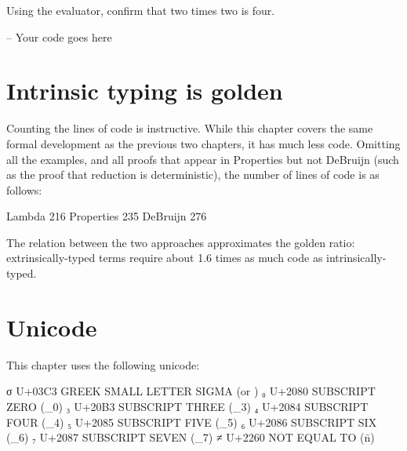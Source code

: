 Using the evaluator, confirm that two times two is four.

\begin{fence}
\begin{code}
-- Your code goes here
\end{code}
\end{fence}

\hypertarget{intrinsic-typing-is-golden}{%
\section{Intrinsic typing is golden}\label{intrinsic-typing-is-golden}}

Counting the lines of code is instructive. While this chapter covers the
same formal development as the previous two chapters, it has much less
code. Omitting all the examples, and all proofs that appear in
Properties but not DeBruijn (such as the proof that reduction is
deterministic), the number of lines of code is as follows:

\begin{myDisplay}
Lambda                      216
Properties                  235
DeBruijn                    276
\end{myDisplay}

The relation between the two approaches approximates the golden ratio:
extrinsically-typed terms require about 1.6 times as much code as
intrinsically-typed.

\hypertarget{unicode}{%
\section{Unicode}\label{unicode}}

This chapter uses the following unicode:

\begin{myDisplay}
σ  U+03C3  GREEK SMALL LETTER SIGMA (\Gs or \sigma)
₀  U+2080  SUBSCRIPT ZERO (\_0)
₃  U+20B3  SUBSCRIPT THREE (\_3)
₄  U+2084  SUBSCRIPT FOUR (\_4)
₅  U+2085  SUBSCRIPT FIVE (\_5)
₆  U+2086  SUBSCRIPT SIX (\_6)
₇  U+2087  SUBSCRIPT SEVEN (\_7)
≠  U+2260  NOT EQUAL TO (\=n)
\end{myDisplay}

